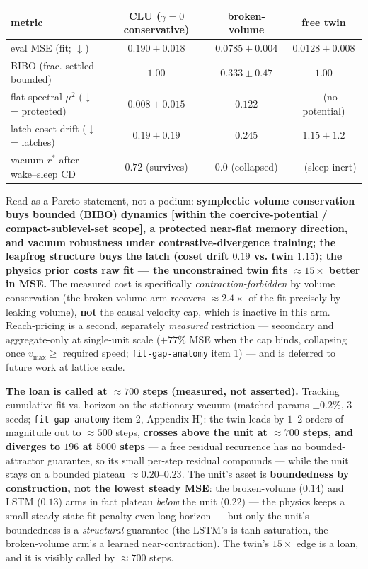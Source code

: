 \documentclass[10pt]{article}
\begin{document}
\begin{center}\small
\begin{tabular}{@{}lccc@{}}
\toprule
metric & CLU ($\gamma=0$ conservative) & broken-volume & free twin \\
\midrule
eval MSE (fit; $\downarrow$) & $0.190\pm0.018$ & $0.0785\pm0.004$ & $\mathbf{0.0128\pm0.008}$ \\
BIBO (frac. settled bounded) & $\mathbf{1.00}$ & $0.333\pm0.47$ & $1.00$ \\
flat spectral $\mu^2$ ($\downarrow$ = protected) & $\mathbf{0.008\pm0.015}$ & $0.122$ & --- (no potential) \\
latch coset drift ($\downarrow$ = latches) & $\mathbf{0.19\pm0.19}$ & $0.245$ & $1.15\pm1.2$ \\
vacuum $r^*$ after wake--sleep CD & $\mathbf{0.72}$ (survives) & $\mathbf{0.0}$ (collapsed) & --- (sleep inert) \\
\bottomrule
\end{tabular}
\end{center}

Read as a Pareto statement, not a podium: \textbf{symplectic volume conservation buys bounded (BIBO) dynamics [within the coercive-potential / compact-sublevel-set scope], a protected near-flat memory direction, and vacuum robustness under contrastive-divergence training; the leapfrog structure buys the latch (coset drift $0.19$ vs. twin $1.15$); the physics prior costs raw fit --- the unconstrained twin fits $\approx15\times$ better in MSE.} The measured cost is specifically \emph{contraction-forbidden} by volume conservation (the broken-volume arm recovers $\approx2.4\times$ of the fit precisely by leaking volume), \textbf{not} the causal velocity cap, which is inactive in this arm. Reach-pricing is a second, separately \emph{measured} restriction --- secondary and aggregate-only at single-unit scale ($+77\%$ MSE when the cap binds, collapsing once $v_{\max}\ge$ required speed; \texttt{fit-gap-anatomy} item 1) --- and is deferred to future work at lattice scale.

\textbf{The loan is called at $\approx700$ steps (measured, not asserted).} Tracking cumulative fit vs. horizon on the stationary vacuum (matched params $\pm0.2\%$, $3$ seeds; \texttt{fit-gap-anatomy} item 2, Appendix H): the twin leads by $1$--$2$ orders of magnitude out to $\approx500$ steps, \textbf{crosses above the unit at $\approx700$ steps, and diverges to $196$ at $5000$ steps} --- a free residual recurrence has no bounded-attractor guarantee, so its small per-step residual compounds --- while the unit stays on a bounded plateau $\approx0.20$--$0.23$. The unit's asset is \textbf{boundedness by construction, not the lowest steady MSE}: the broken-volume ($0.14$) and LSTM ($0.13$) arms in fact plateau \emph{below} the unit ($0.22$) --- the physics keeps a small steady-state fit penalty even long-horizon --- but only the unit's boundedness is a \emph{structural} guarantee (the LSTM's is tanh saturation, the broken-volume arm's a learned near-contraction). The twin's $15\times$ edge is a loan, and it is visibly called by $\approx700$ steps.
\end{document}
